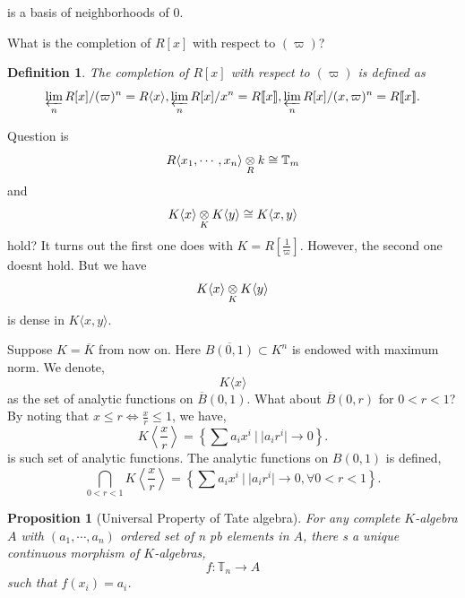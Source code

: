 \documentclass[10pt]{article}
\numberwithin{equation}{section}
\newtheorem{proposition}{Proposition}[section]
\newtheorem{definition}{Definition}[section]
\newcommand{\T}[0]{\mathbb{T}}
\newcommand{\sep}[0]{\:|\:}
\newcommand{\tens}[1]{%
  \mathbin{\mathop{\otimes}\displaylimits_{#1}}%
}
\begin{document}
is a basis of neighborhoods of $0$. 
\par What is the completion of $R[x]$ with respect to $(\varpi)$?
\begin{definition}
  The completion of $R[x]$ with respect to $(\varpi)$ is defined as 
  \begin{equation*}
    \varprojlim_n R[x]/(\varpi)^n = R\langle x\rangle, \varprojlim_n R[x]/x^n = R\llbracket x\rrbracket,\varprojlim_n R[x]/(x,\varpi)^n = R\llbracket x\rrbracket.
  \end{equation*}
\end{definition}

Question is 
\begin{equation*}
  R\langle x_1,\cdots, x_n\rangle\tens{R}k \cong \T_m
\end{equation*}
and 
\begin{equation*}
  K\langle x\rangle\tens{K}K\langle y\rangle \cong K\langle x,y\rangle
\end{equation*}
hold? It turns out the first one does with $K=R\left[{\frac 1 \varpi}\right]$. However, the second one doesnt hold. But we have 
\begin{equation*}
  K\langle x\rangle\tens{K} K\langle y\rangle
\end{equation*}
 is dense in $K\langle x,y\rangle$.
 \par Suppose $K=\overline{K}$ from now on. Here $\overline{B(0,1)}\subset K^n$ is endowed with maximum norm. We denote,
 \begin{equation*}
  K\langle x\rangle
 \end{equation*}
 as the set of analytic functions on $\overline{B}(0,1)$. What about $\overline{B}(0,r)$ for $0<r<1$?
 By noting that $x\leq r\Leftrightarrow {\frac x r}\leq 1$, we have,
 \begin{equation*}
  K\left\langle {\frac x r}\right\rangle = \left\{\sum a_i x^i\sep \vert a_ir^i\vert\to 0\right\}.
 \end{equation*}
 is such set of analytic functions. The analytic functions on $B(0,1)$ is defined,
 \begin{equation*}
  \bigcap_{0<r<1}K\left\langle {\frac x r}\right\rangle = \left\{\sum a_ix^i \sep \vert a_ir^i\vert\to0,\forall 0<r<1\right\}.
 \end{equation*}
 \begin{proposition}[Universal Property of Tate algebra]
  For any complete $K$-algebra $A$ with $(a_1,\cdots,a_n)$ ordered set of n pb elements in $A$, there s a unique continuous morphism of $K$-algebras,
  \begin{equation*}
    f:\T_n\to A
  \end{equation*}
  such that $f(x_i)=a_i$.
 \end{proposition}
\end{document}
